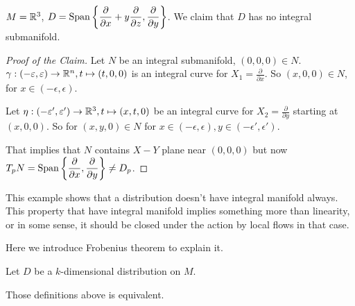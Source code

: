 \begin{example}
     $ M=\mathbb R^3 $,  $ D=\mathrm{Span}\left\{\displaystyle\frac{\partial}{\partial x}+y\frac{\partial }{\partial z},\frac{\partial }{\partial y}\right\} $. We claim that  $ D  $ has no integral submanifold.  
    
\end{example}
\begin{proof}[Proof of the Claim]
    Let  $ N  $ be an integral submanifold,  $ (0,0,0)\in N $.  $ \gamma:
    (-\varepsilon,\varepsilon)\rightarrow \mathbb R^n,t\mapsto (t,0,0) $ is an  integral curve for  $ X_1=\frac{\partial}{\partial x}$. So  $ (x,0,0)\in N $, for  $ x\in (-\epsilon,\epsilon) $.
    
    Let  $ \eta:(-\varepsilon',\varepsilon')\rightarrow \mathbb R^3,t\mapsto (x,t,0) $ be an integral curve for  $ X_2=\frac{\partial}{\partial y} $ starting at  $ (x,0,0) $. So for  $ (x,y,0) \in N$ for  $ x\in(-\epsilon,\epsilon),y\in(-\epsilon',\epsilon') $.
    
    That implies that  $ N  $ contains  $ X-Y $ plane near  $ (0,0,0) $ but now  $ T_pN=\mathrm{Span}\displaystyle\left\{\frac{\partial }{\partial x},\frac{\partial}{\partial y}\right\}\neq D_p $.   
\end{proof}
\begin{remark}
    This example shows that a distribution doesn't have integral manifold always. This property that have integral manifold implies something more than linearity, or in some sense, it should be closed under the action by local flows in that case.

    Here we introduce Frobenius theorem to explain it.
\end{remark}
\begin{definition}
    Let  $ D  $ be a  $ k $-dimensional distribution on  $ M $.
    
\end{definition}
\begin{theorem}\label{thm:local-frobenius}
    Those definitions above is equivalent.
\end{theorem}
